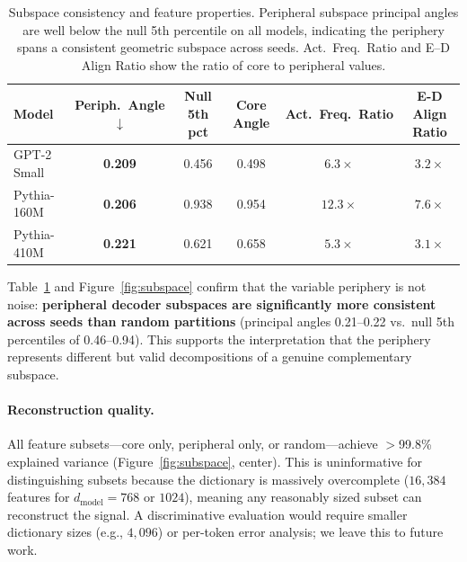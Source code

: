 \documentclass[final]{article}
\begin{document}
\begin{table}[t]
\caption{Subspace consistency and feature properties. Peripheral subspace principal angles are well below the null 5th percentile on all models, indicating the periphery spans a consistent geometric subspace across seeds. Act.\ Freq.\ Ratio and E--D Align Ratio show the ratio of core to peripheral values.}
\label{tab:subspace}
\centering
\begin{tabular}{lccccc}
\toprule
Model & Periph.\ Angle $\downarrow$ & Null 5th pct & Core Angle & Act.\ Freq.\ Ratio & E-D Align Ratio \\
\midrule
GPT-2 Small & \textbf{0.209} & 0.456 & 0.498 & $6.3\times$ & $3.2\times$ \\
Pythia-160M & \textbf{0.206} & 0.938 & 0.954 & $12.3\times$ & $7.6\times$ \\
Pythia-410M & \textbf{0.221} & 0.621 & 0.658 & $5.3\times$ & $3.1\times$ \\
\bottomrule
\end{tabular}
\end{table}

Table~\ref{tab:subspace} and Figure~\ref{fig:subspace} confirm that the variable periphery is not noise: \textbf{peripheral decoder subspaces are significantly more consistent across seeds than random partitions} (principal angles 0.21--0.22 vs.\ null 5th percentiles of 0.46--0.94). This supports the interpretation that the periphery represents different but valid decompositions of a genuine complementary subspace.

\paragraph{Reconstruction quality.} All feature subsets---core only, peripheral only, or random---achieve $>$99.8\% explained variance (Figure~\ref{fig:subspace}, center). This is uninformative for distinguishing subsets because the dictionary is massively overcomplete ($16{,}384$ features for $d_{\text{model}} = 768$ or $1024$), meaning any reasonably sized subset can reconstruct the signal. A discriminative evaluation would require smaller dictionary sizes (e.g., $4{,}096$) or per-token error analysis; we leave this to future work.
\end{document}
